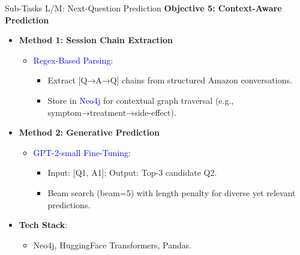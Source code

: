 \documentclass{beamer}
\begin{document}
\begin{frame}{Sub-Tasks L/M: Next-Question Prediction}
\footnotesize
\textbf{Objective 5: Context-Aware Prediction}
\begin{itemize}
    \item \textbf{Method 1: Session Chain Extraction}
    \begin{itemize}
        \item \textcolor{blue}{Regex-Based Parsing}:
        \begin{itemize}
            \item Extract [Q→A→Q] chains from structured Amazon conversations.
            \item Store in \textcolor{blue}{Neo4j} for contextual graph traversal (e.g., symptom→treatment→side-effect).
        \end{itemize}
    \end{itemize}
    
    \item \textbf{Method 2: Generative Prediction}
    \begin{itemize}
        \item \textcolor{blue}{GPT-2-small Fine-Tuning}:
        \begin{itemize}
            \item Input: [Q1, A1]; Output: Top-3 candidate Q2.
            \item Beam search (beam=5) with length penalty for diverse yet relevant predictions.
        \end{itemize}
    \end{itemize}
    
    \item \textbf{Tech Stack}:
    \begin{itemize}
        \item Neo4j, HuggingFace Transformers, Pandas.
    \end{itemize}
\end{itemize}
\end{frame}
\end{document}
